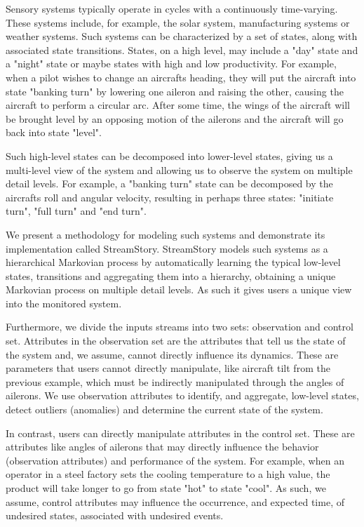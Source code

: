 Sensory systems typically operate in cycles with a continuously time-varying. These 
systems include, for example, the solar system, manufacturing systems or weather 
systems. Such systems can be characterized by a set of states, along with associated
state transitions. States, on a high level, may include a "day" state and a "night"
state or maybe states with high and low productivity. For example, when a pilot wishes
to change an aircrafts heading, they will put the aircraft into state "banking turn"
by lowering one aileron and raising the other, causing the aircraft to perform a
circular arc. After some time, the wings of the aircraft will be brought level by
an opposing motion of the ailerons and the aircraft will go back into state "level".

Such high-level states can be decomposed into lower-level states, giving us a 
multi-level view of the system and allowing us to observe the system on multiple 
detail levels. For example, a "banking turn" state can be decomposed by the
aircrafts roll and angular velocity, resulting in perhaps three states: "initiate
turn", "full turn" and "end turn".

We present a methodology for modeling such systems and demonstrate its implementation
called StreamStory. StreamStory models such systems as a hierarchical Markovian process
by automatically learning the typical low-level states, transitions and aggregating 
them into a hierarchy, obtaining a unique Markovian process on multiple detail levels.
As such it gives users a unique view into the monitored system.

Furthermore, we divide the inputs streams into two sets: observation and control set.
Attributes in the observation set are the attributes that tell us the state of the 
system and, we assume, cannot directly influence its dynamics. These are parameters
that users cannot directly manipulate, like aircraft tilt from the previous example,
which must be indirectly manipulated through the angles of ailerons. We use observation
attributes to identify, and aggregate, low-level states, detect outliers (anomalies) 
and determine the current state of the system.

In contrast, users can directly manipulate attributes in the control set. These 
are attributes like angles of ailerons that may directly influence the behavior 
(observation attributes) and performance of the system. For example, when an operator 
in a steel factory sets the cooling temperature to a high value, the product will
take longer to go from state "hot" to state "cool". As such, we assume, control attributes
may influence the occurrence, and expected time, of undesired states, associated with
undesired events.

